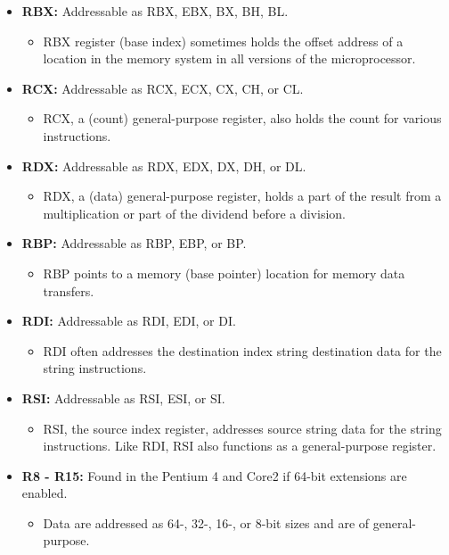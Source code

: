 \documentclass{article}
\begin{document}
\begin{itemize}
    \item \textbf{RBX:} Addressable as RBX, EBX, BX, BH, BL.
    \begin{itemize}
        \item RBX register (base index) sometimes holds the offset address of a location in the memory system in all versions of the microprocessor.
    \end{itemize}
    
    \item \textbf{RCX:} Addressable as RCX, ECX, CX, CH, or CL.
    \begin{itemize}
        \item RCX, a (count) general-purpose register, also holds the count for various instructions.
    \end{itemize}
    
    \item \textbf{RDX:} Addressable as RDX, EDX, DX, DH, or DL.
    \begin{itemize}
        \item RDX, a (data) general-purpose register, holds a part of the result from a multiplication or part of the dividend before a division.
    \end{itemize}
    
    \item \textbf{RBP:} Addressable as RBP, EBP, or BP.
    \begin{itemize}
        \item RBP points to a memory (base pointer) location for memory data transfers.
    \end{itemize}
    
    \item \textbf{RDI:} Addressable as RDI, EDI, or DI.
    \begin{itemize}
        \item RDI often addresses the destination index string destination data for the string instructions.
    \end{itemize}
    
    \item \textbf{RSI:} Addressable as RSI, ESI, or SI.
    \begin{itemize}
        \item RSI, the source index register, addresses source string data for the string instructions. Like RDI, RSI also functions as a general-purpose register.
    \end{itemize}
    
    \item \textbf{R8 - R15:} Found in the Pentium 4 and Core2 if 64-bit extensions are enabled.
    \begin{itemize}
        \item Data are addressed as 64-, 32-, 16-, or 8-bit sizes and are of general-purpose.
    \end{itemize}
\end{itemize}
\end{document}
